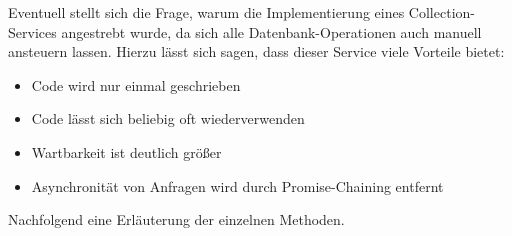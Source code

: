 Eventuell stellt sich die Frage, warum die Implementierung eines Collection-Services angestrebt wurde, da sich alle Datenbank-Operationen auch manuell ansteuern lassen. Hierzu lässt sich
sagen, dass dieser Service viele Vorteile bietet:
\begin{itemize}
\item{Code wird nur einmal geschrieben}
\item{Code lässt sich beliebig oft wiederverwenden}
\item{Wartbarkeit ist deutlich größer}
\item{Asynchronität von Anfragen wird durch Promise-Chaining entfernt}
\end{itemize}

Nachfolgend eine Erläuterung der einzelnen Methoden.



